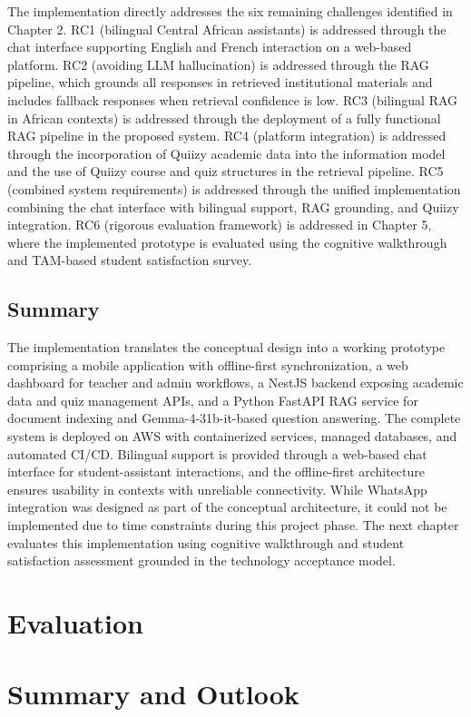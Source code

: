 \documentclass[a4paper,9pt,twocolumn]{extarticle}
\begin{document}
The implementation directly addresses the six remaining challenges identified in Chapter 2. RC1 (bilingual Central African assistants) is addressed through the chat interface supporting English and French interaction on a web-based platform. RC2 (avoiding LLM hallucination) is addressed through the RAG pipeline, which grounds all responses in retrieved institutional materials and includes fallback responses when retrieval confidence is low. RC3 (bilingual RAG in African contexts) is addressed through the deployment of a fully functional RAG pipeline in the proposed system. RC4 (platform integration) is addressed through the incorporation of Quiizy academic data into the information model and the use of Quiizy course and quiz structures in the retrieval pipeline. RC5 (combined system requirements) is addressed through the unified implementation combining the chat interface with bilingual support, RAG grounding, and Quiizy integration. RC6 (rigorous evaluation framework) is addressed in Chapter 5, where the implemented prototype is evaluated using the cognitive walkthrough and TAM-based student satisfaction survey.

\subsection{Summary}
\label{sec:impl:summary}

The implementation translates the conceptual design into a working prototype comprising a mobile application with offline-first synchronization, a web dashboard for teacher and admin workflows, a NestJS backend exposing academic data and quiz management APIs, and a Python FastAPI RAG service for document indexing and Gemma-4-31b-it-based question answering. The complete system is deployed on AWS with containerized services, managed databases, and automated CI/CD. Bilingual support is provided through a web-based chat interface for student-assistant interactions, and the offline-first architecture ensures usability in contexts with unreliable connectivity. While WhatsApp integration was designed as part of the conceptual architecture, it could not be implemented due to time constraints during this project phase. The next chapter evaluates this implementation using cognitive walkthrough and student satisfaction assessment grounded in the technology acceptance model.


\section{Evaluation}
\label{sec:evaluation}


\section{Summary and Outlook}


\newpage
\appendix
\printbibliography[heading=bibintoc]
\printglossary[title=Glossary,toctitle=Glossary]
\end{document}

